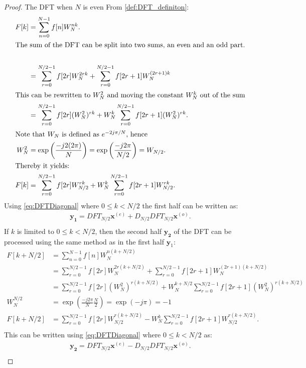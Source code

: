 \begin{proof}{The DFT when $N$ is even}
From \autoref{def:DFT_definiton}:
    \begin{align*}
         F[k]&=\sum^{N-1}_{n=0}f[n]W_N^{nk}.\\
        \intertext{The sum of the DFT can be split into two sums, an even and an odd part.}\\
        &=\sum^{N/2-1}_{r=0}f[2r]W_N^{2rk}+\sum^{N/2-1}_{r=0}f[2r+1]W_N^{(2r+1)k}\\
        \intertext{This can be rewritten to $W_N^2$ and moving the constant $W_N^k$ out of the sum}
        &=\sum^{N/2-1}_{r=0}f[2r](W_N^2)^{rk}+W_N^k\sum^{N/2-1}_{r=0}f[2r+1](W_N^2)^{rk}.\\
        \intertext{Note that $W_N$ is defined as $e^{-2j\pi/N}$, hence}
        W_N^2 &= \exp\left(\frac{-j2(2\pi)}{N}\right) = \exp\left(\frac{-j2\pi}{N/2}\right) = W_{N/2}.\\
        \intertext{Thereby it yields:}
        F[k] &= \sum^{N/2-1}_{r=0}f[2r]W^{rk}_{N/2}+W^k_N\sum^{N/2-1}_{r=0}f[2r+1]W^{rk}_{N/2}.\\
    \end{align*}
    Using \eqref{eq:DFTDiagonal} where $0 \leq k < N/2$ the first half can be written as:
     \begin{align*}
        \mathbf{y_1}=DFT_{N/2}\mathbf{x}^{(e)}+D_{N/2}DFT_{N/2}\mathbf{x}^{(o)}.\\ 
     \end{align*}
    If $k$ is limited to $0 \leq k < N/2$, then the second half $\mathbf{y_2}$ of the DFT can be processed using the same method as in the first half $\mathbf{y}_1$:
    \begin{align*}
        F[k+N/2] &= \sum^{N-1}_{n=0}f[n]W_N^{n(k+N/2)}\\
        &=\sum^{N/2-1}_{r=0}f[2r]W_N^{2r(k+N/2)}+\sum^{N/2-1}_{r=0}f[2r+1]W_N^{(2r+1)(k+N/2)}\\
        &=\sum^{N/2-1}_{r=0}f[2r](W_N^2)^{r(k+N/2)}+W_N^{k+N/2}\sum^{N/2-1}_{r=0}f[2r+1](W_N^2)^{r(k+N/2)}\\
        W_N^{N/2}&=\exp\left(\frac{-j2\pi}{N}\frac{N}{2}\right)=\exp\left(-j\pi\right)=-1\\
        F[k+N/2] &=\sum^{N/2-1}_{r=0}f[2r]W_{N/2}^{r(k+N/2)}-W_N^{k}\sum^{N/2-1}_{r=0}f[2r+1]W_{N/2}^{r(k+N/2)}.\\
    \end{align*}
    This can be written using \eqref{eq:DFTDiagonal} where $0 \leq k < N/2$ as:
    \begin{align*}
        \mathbf{y_2}=DFT_{N/2}\mathbf{x}^{(e)}-D_{N/2}DFT_{N/2}\mathbf{x}^{(o)}.\\ 
     \end{align*}
     \cite[67]{ryan2019linear}
\end{proof}
